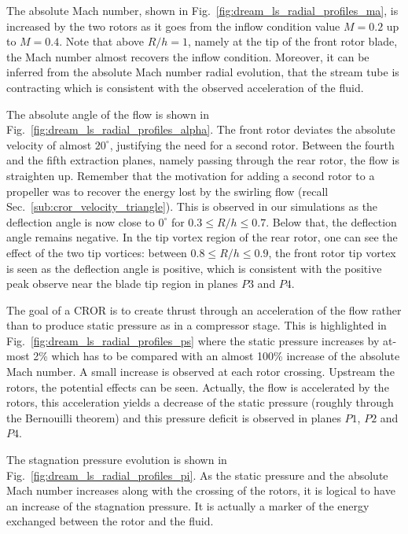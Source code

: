The absolute Mach number, shown in 
Fig.~\ref{fig:dream_ls_radial_profiles_ma}, is increased by
the two rotors as it goes from the inflow condition value $M=0.2$
up to $M=0.4$. Note that above $R/h=1$, namely at the tip
of the front rotor blade, the Mach number
almost recovers the inflow condition. Moreover, it can be inferred from the
absolute Mach number radial evolution, that the stream tube is contracting which is consistent
with the observed acceleration of the fluid.

The absolute angle of the flow is shown in 
Fig.~\ref{fig:dream_ls_radial_profiles_alpha}. The front rotor
deviates the absolute velocity of almost $20^\circ$, justifying the need
for a second rotor. Between the fourth and the fifth extraction planes, namely
passing through the rear rotor, the flow is straighten up. Remember that 
the motivation for adding a second rotor to a propeller
was to recover the energy lost by the swirling flow
(recall Sec.~\ref{sub:cror_velocity_triangle}). This is observed in our simulations as
the deflection angle is now close to $0^\circ$ for $0.3 \leq R/h \leq 0.7$.
Below that, the deflection angle remains negative. In the tip vortex region
of the rear rotor, one can see the effect of the two tip vortices: between 
$0.8 \leq R/h \leq 0.9$, the front rotor tip vortex is seen as the 
deflection angle is positive, which is consistent with the positive
peak observe near the blade tip region in planes $P3$ and $P4$.

The goal of a CROR is to create thrust through an acceleration of 
the flow rather than to produce static pressure as in a compressor stage.
This is highlighted in Fig.~\ref{fig:dream_ls_radial_profiles_ps}
where the static pressure increases by at-most 2\% which has to 
be compared with an almost 100\% increase of the absolute
Mach number. 
A small increase is observed at each
rotor crossing. Upstream the rotors, the potential effects can
be seen. Actually, the flow is accelerated by the rotors, this acceleration
yields a decrease of the static pressure 
(roughly through the Bernouilli theorem) and this pressure deficit is observed in
planes $P1$, $P2$ and $P4$.

The stagnation pressure evolution is shown in 
Fig.~\ref{fig:dream_ls_radial_profiles_pi}. As the static pressure
and the absolute Mach number increases along with the crossing of the rotors,
it is logical to have an increase of the stagnation pressure.
It is actually a marker of the energy exchanged between the rotor
and the fluid.

